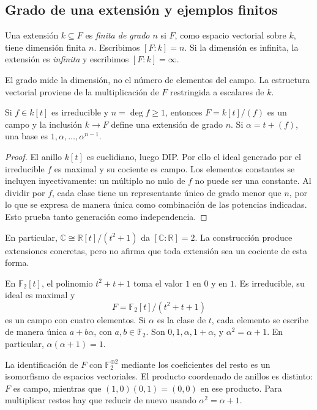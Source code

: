 \subsection{Grado de una extensión y ejemplos finitos}\label{tema:22-1-2}\label{tema:19-1-2b}
\begin{defi}
Una extensión $k\subseteq F$ es \emph{finita de grado $n$} si $F$, como espacio vectorial sobre $k$, tiene dimensión finita $n$. Escribimos $[F:k]=n$. Si la dimensión es infinita, la extensión es \emph{infinita} y escribimos $[F:k]=\infty$.
\end{defi}
El grado mide la dimensión, no el número de elementos del campo. La estructura vectorial proviene de la multiplicación de $F$ restringida a escalares de $k$.

\begin{prop}\label{prop:C22-grado-cociente}
Si $f\in k[t]$ es irreducible y $n=\deg f\geq1$, entonces $F=k[t]/(f)$ es un campo y la inclusión $k\to F$ define una extensión de grado $n$. Si $\alpha=t+(f)$, una base es $1,\alpha,\ldots,\alpha^{n-1}$.
\end{prop}
\begin{proof}
El anillo $k[t]$ es euclidiano, luego DIP. Por ello el ideal generado por el irreducible $f$ es maximal y su cociente es campo. Los elementos constantes se incluyen inyectivamente: un múltiplo no nulo de $f$ no puede ser una constante. Al dividir por $f$, cada clase tiene un representante único de grado menor que $n$, por lo que se expresa de manera única como combinación de las potencias indicadas. Esto prueba tanto generación como independencia.
\end{proof}
En particular, $\mathbb C\cong\mathbb R[t]/(t^2+1)$ da $[\mathbb C:\mathbb R]=2$. La construcción produce extensiones concretas, pero no afirma que toda extensión sea un cociente de esta forma.

\begin{ejem}
En $\mathbb F_2[t]$, el polinomio $t^2+t+1$ toma el valor $1$ en $0$ y en $1$. Es irreducible, su ideal es maximal y
\[
F=\mathbb F_2[t]/(t^2+t+1)
\]
es un campo con cuatro elementos. Si $\alpha$ es la clase de $t$, cada elemento se escribe de manera única $a+b\alpha$, con $a,b\in\mathbb F_2$. Son $0,1,\alpha,1+\alpha$, y $\alpha^2=\alpha+1$. En particular, $\alpha(\alpha+1)=1$.
\end{ejem}
\begin{obs}
La identificación de $F$ con $\mathbb F_2^{\oplus2}$ mediante los coeficientes del resto es un isomorfismo de espacios vectoriales. El producto coordenado de anillos es distinto: $F$ es campo, mientras que $(1,0)(0,1)=(0,0)$ en ese producto. Para multiplicar restos hay que reducir de nuevo usando $\alpha^2=\alpha+1$.
\end{obs}
